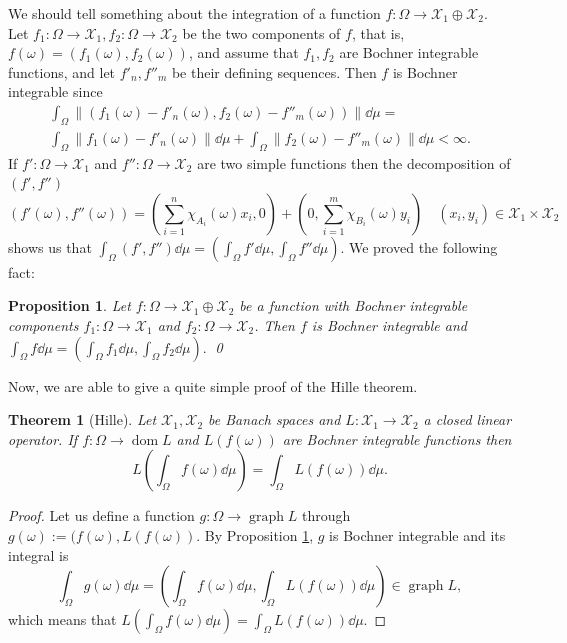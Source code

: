 \documentclass[a4paper, 12pt]{article}
\newtheorem{theo}[lem]{Theorem}
\newtheorem{state}[lem]{Proposition}
\newcommand{\graph}{\mathop{\mathrm{graph}}}
\newcommand{\dom}{\mathop{\mathrm{dom}}}
\begin{document}
We should tell something about the integration of a function $f \colon \Omega \rightarrow \mathcal{X}_1 \oplus \mathcal{X}_2$. Let $f_1 \colon \Omega \rightarrow \mathcal{X}_1, f_2\colon \Omega\rightarrow \mathcal{X}_2$ be the two components of $f$, that is, $f(\omega) = (f_1(\omega), f_2(\omega))$, and assume that $f_1, f_2$ are Bochner integrable functions, and let $f'_{n}, f''_{m}$ be their defining sequences. Then $f$ is Bochner integrable since 
\begin{equation*}
\begin{split}
\int_{\Omega} \| (f_1(\omega)-f'_n(\omega), f_2(\omega)-f''_m(\omega)) \| \dd{\mu} = \\
\int_{\Omega} \|f_1(\omega)-f'_n(\omega) \| \dd{\mu} + \int_{\Omega} \|f_2(\omega)-f''_m(\omega)\| \dd{\mu} < \infty.
\end{split}
\end{equation*}
If $f'\colon \Omega \rightarrow \mathcal{X}_1$ and $f''\colon \Omega \rightarrow \mathcal{X}_2$ are two simple functions then the decomposition of $(f', f'')$
$$
(f'(\omega), f''(\omega))=\left(\sum^{n}_{i=1}\chi_{A_i}(\omega)x_i,0 \right) + \left(0, \sum^{m}_{i=1} \chi_{B_i}(\omega)y_i \right) \quad (x_i,y_i) \in \mathcal{X}_1 \times \mathcal{X}_2
$$
shows us that $\int_{\Omega} (f',f'') \dd{\mu} = (\int_{\Omega}f' \dd{\mu}, \int_{\Omega} f'' \dd{\mu})$. We proved the following fact:
\begin{state}\label{all:integralas-szorzaton} Let $f \colon \Omega \rightarrow \mathcal{X}_1 \oplus \mathcal{X}_2$ be a function with Bochner integrable components $f_1 \colon \Omega \rightarrow \mathcal{X}_1$ and $f_2 \colon \Omega \rightarrow \mathcal{X}_2$. Then $f$ is Bochner integrable and $\int_{\Omega} f \dd{\mu} = \left(\int_{\Omega} f_1 \dd{\mu}, \int_{\Omega} f_2 \dd{\mu} \right).$ \qed
\end{state}
Now, we are able to give a quite simple proof of the Hille theorem.
\begin{theo}[Hille]\label{all:hille-theorem}
Let $\mathcal{X}_1, \mathcal{X}_2$ be Banach spaces and $L \colon \mathcal{X}_1 \rightarrow \mathcal{X}_2$ a closed linear operator. If $f \colon \Omega \rightarrow \dom{L}$ and $L(f(\omega))$ are Bochner integrable functions then
$$
L\left( \int_{\Omega} f(\omega) \dd{\mu} \right) = \int_{\Omega} L(f(\omega)) \dd{\mu}.
$$
\end{theo}
\begin{proof} Let us define a function $g \colon \Omega \rightarrow \graph{L}$ through $g(\omega) := (f(\omega), L(f(\omega))$. By Proposition \ref{all:integralas-szorzaton}, $g$ is Bochner integrable and its integral is
$$\int_{\Omega} g(\omega) \dd{\mu} = \left(\int_{\Omega} f(\omega) \dd{\mu}, \int_{\Omega} L(f(\omega)) \dd{\mu}\right) \in \graph{L},$$
which means that $L\left( \int_{\Omega} f(\omega) \dd{\mu} \right) = \int_{\Omega} L(f(\omega)) \dd{\mu}$.
\end{proof}
\end{document}
